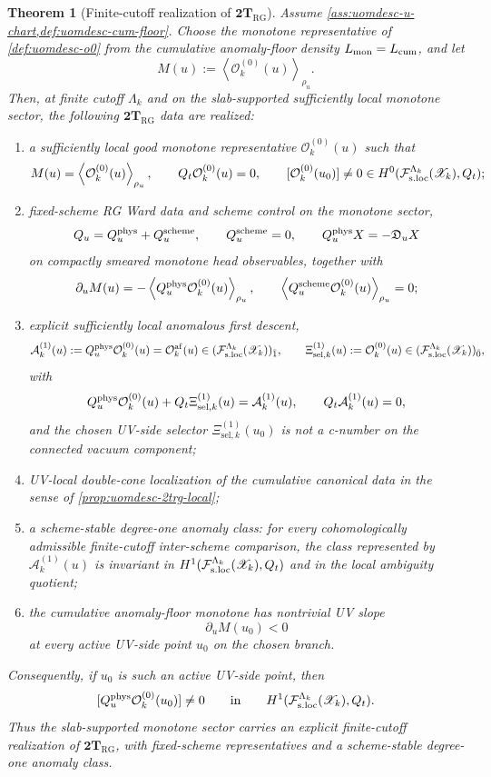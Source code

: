 \documentclass[11pt]{article}
\theoremstyle{definition}
\theoremstyle{plain}
\newtheorem{theorem}[definition]{Theorem}
\theoremstyle{remark}
\newcommand{\Fsloc}{\mathcal F_{\rm s.loc}}
\newcommand{\Xscr}{\mathscr X}
\newcommand{\Ozero}{\mathcal O^{(0)}}
\newcommand{\Oaf}{\mathcal O^{\mathrm{af}}}
\newcommand{\Aone}{\mathcal A^{(1)}}
\newcommand{\Xiselk}{\Xi^{(1)}_{\mathrm{sel},k}}
\newcommand{\Qt}{Q_t}
\newcommand{\Qu}{Q_u}
\newcommand{\Du}{\mathfrak D_u}
\newcommand{\Quphys}{Q_u^{\rm phys}}
\newcommand{\Quscheme}{Q_u^{\rm scheme}}
\newcommand{\pair}[1]{\left\langle #1 \right\rangle}
\begin{document}
\begin{theorem}[Finite-cutoff realization of \texorpdfstring{\(\mathbf{2T}_{\mathrm{RG}}\)}{2T_RG}]
\label{thm:uomdesc-2trg}
Assume \cref{ass:uomdesc-u-chart,def:uomdesc-cum-floor}.
Choose the monotone representative of \cref{def:uomdesc-o0} from the cumulative anomaly-floor density
\(
L_{\rm mon}=L_{\rm cum}
\),
and let
\[
M(u):=\pair{\Ozero_k(u)}_{\rho_u}.
\]
Then, at finite cutoff \(\Lambda_k\) and on the slab-supported sufficiently local monotone sector,
the following \(\mathbf{2T}_{\mathrm{RG}}\) data are realized:
\begin{enumerate}[leftmargin=2em]
\item a sufficiently local good monotone representative \(\Ozero_k(u)\) such that
  \[
  M(u)=\pair{\Ozero_k(u)}_{\rho_u},
  \qquad
  \Qt\Ozero_k(u)=0,
  \qquad
  [\Ozero_k(u_0)]\neq 0\in H^0(\Fsloc^{\Lambda_k}(\Xscr_k),\Qt);
  \]
\item fixed-scheme RG Ward data and scheme control on the monotone sector,
  \[
  \Qu=\Quphys+\Quscheme,
  \qquad
  \Quscheme=0,
  \qquad
  \Quphys X=-\Du X
  \]
  on compactly smeared monotone head observables, together with
  \[
  \partial_u M(u)=-\pair{\Quphys\Ozero_k(u)}_{\rho_u},
  \qquad
  \pair{\Quscheme\Ozero_k(u)}_{\rho_u}=0;
  \]
\item explicit sufficiently local anomalous first descent,
  \[
  \Aone_k(u):=\Quphys\Ozero_k(u)=\Oaf_k(u)\in(\Fsloc^{\Lambda_k}(\Xscr_k))_{\bar 1},
  \qquad
  \Xiselk(u):=\Ozero_k(u)\in(\Fsloc^{\Lambda_k}(\Xscr_k))_{\bar 0},
  \]
  with
  \[
  \Quphys\Ozero_k(u)+\Qt\Xiselk(u)=\Aone_k(u),
  \qquad
  \Qt\Aone_k(u)=0,
  \]
  and the chosen UV-side selector \(\Xiselk(u_0)\) is not a c-number on the
  connected vacuum component;
\item UV-local double-cone localization of the cumulative canonical data in the sense of
  \cref{prop:uomdesc-2trg-local};
\item a scheme-stable degree-one anomaly class: for every cohomologically admissible
  finite-cutoff inter-scheme comparison, the class represented by \(\Aone_k(u)\) is invariant
  in \(H^1(\Fsloc^{\Lambda_k}(\Xscr_k),\Qt)\) and in the local ambiguity quotient;
\item the cumulative anomaly-floor monotone has nontrivial UV slope
  \[
  \partial_u M(u_0)<0
  \]
  at every active UV-side point \(u_0\) on the chosen branch.
\end{enumerate}
Consequently, if \(u_0\) is such an active UV-side point, then
\[
[\Quphys\Ozero_k(u_0)]\neq 0
\qquad\text{in}\qquad
H^1(\Fsloc^{\Lambda_k}(\Xscr_k),\Qt).
\]
Thus the slab-supported monotone sector carries an explicit finite-cutoff realization of
\(\mathbf{2T}_{\mathrm{RG}}\), with fixed-scheme representatives and a scheme-stable degree-one
anomaly class.
\end{theorem}
\end{document}
